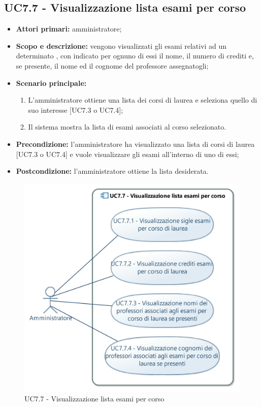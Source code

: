 \documentclass[AnalisiDeiRequisiti.tex]{subfiles}
\begin{document}
\subsection{UC7.7 - Visualizzazione lista esami per corso}
\begin{itemize}
	\item \textbf{Attori primari:} amministratore;
	\item \textbf{Scopo e descrizione:} vengono visualizzati gli esami relativi ad un determinato , con indicato per ognuno di essi il nome, il numero di crediti e, se presente, il nome ed il cognome del professore assegnatogli;
	\item \textbf{Scenario principale:}
	\begin{enumerate}
		\item L'amministratore ottiene una lista dei corsi di laurea e seleziona quello di suo interesse [UC7.3 o UC7.4];
		\item Il sistema mostra la lista di esami associati al corso selezionato.
	\end{enumerate}
	\item \textbf{Precondizione:} l'amministratore ha visualizzato una lista di corsi di laurea [UC7.3 o UC7.4] e vuole visualizzare gli esami all'interno di uno di essi; 
	\item \textbf{Postcondizione:} l'amministratore ottiene la lista desiderata.
\end{itemize}
\begin{figure}[H]
	\centering
	\includegraphics[width=0.8\linewidth]{UC7_7.jpg}
	\caption{UC7.7 - Visualizzazione lista esami per corso}
	\label{fig:UC7.7 - Visualizzazione lista esami per corso}
\end{figure}
\end{document}

